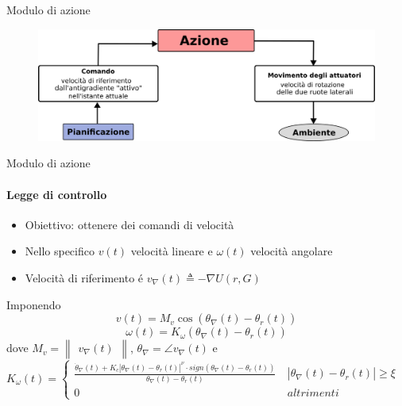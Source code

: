 \documentclass[handout]{beamer}
\begin{document}
\begin{frame}{Modulo di azione}
\centering
\begin{figure}
\includegraphics{azione.png}
\end{figure}
\end{frame}

\begin{frame}{Modulo di azione}
\framesubtitle{Legge di controllo}
\begin{itemize}
\item Obiettivo: ottenere dei comandi di velocità 
\item Nello specifico $v(t)$ velocità lineare e $\omega(t)$ velocità angolare
\item Velocità di riferimento é $v_{\nabla}(t) \triangleq -\nabla U(r,G)$
\end{itemize}
\vspace{2mm}
Imponendo
\begin{equation}
v(t) = M_v \cos(\theta_{\nabla}(t) - \theta_r(t))
\end{equation}
\begin{equation}
\omega(t) = K_{\omega}(\theta_{\nabla}(t) - \theta_r(t))
\end{equation}
dove \(M_v=\begin{Vmatrix}v_{\nabla}(t)\end{Vmatrix}\), \(\theta_{\nabla}=\angle v_{\nabla}(t)\) e \\
\(K_{\omega}(t)= \begin{cases}
\frac{\dot{\theta}_{\nabla}(t) + K_c|\theta_{\nabla}(t)-\theta_r(t)|^{\nu} \cdot sign(\theta_{\nabla}(t) - \theta_r(t))}{\theta_{\nabla}(t) - \theta_r(t)} \ &|\theta_{\nabla}(t)-\theta_r(t)| \geq \xi \\
0 \ &altrimenti
\end{cases}\)
\end{frame}
\end{document}
